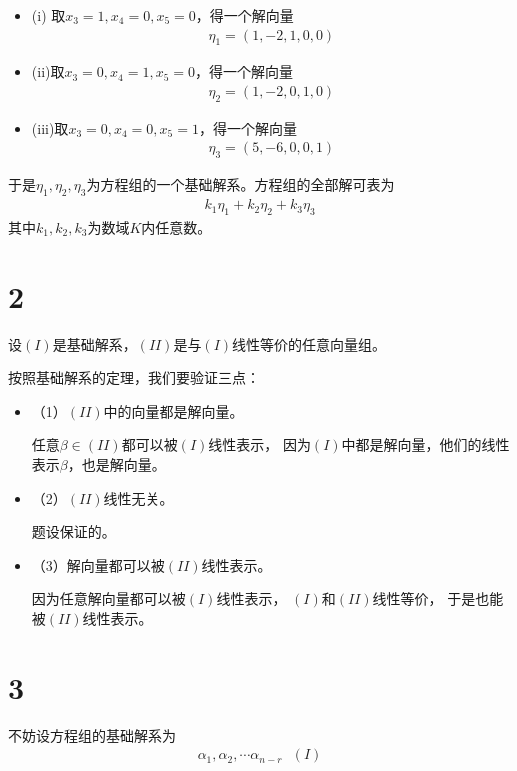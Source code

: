 \documentclass{article}
\begin{document}
\begin{itemize}
  \item (i) 取$x_3 = 1, x_4 = 0, x_5 = 0$，得一个解向量
        \begin{align*}
          \eta_1 = (1, -2, 1, 0, 0)
        \end{align*}
  \item (ii)取$x_3 = 0, x_4 = 1, x_5 = 0$，得一个解向量
        \begin{align*}
          \eta_2 = (1, -2, 0, 1, 0)
        \end{align*}
  \item (iii)取$x_3 = 0, x_4 = 0, x_5 = 1$，得一个解向量
        \begin{align*}
          \eta_3 = (5, -6, 0, 0, 1)
        \end{align*}
\end{itemize}
于是$\eta_1, \eta_2, \eta_3$为方程组的一个基础解系。方程组的全部解可表为
\begin{align*}
  k_1 \eta_1 + k_2 \eta_2 + k_3 \eta_3
\end{align*}
其中$k_1, k_2, k_3$为数域$K$内任意数。

\section*{2}

设$(I)$是基础解系，$(II)$是与$(I)$线性等价的任意向量组。

按照基础解系的定理，我们要验证三点：
\begin{itemize}
  \item （1）$(II)$中的向量都是解向量。

        任意$\beta \in (II)$都可以被$(I)$线性表示，
        因为$(I)$中都是解向量，他们的线性表示$\beta$，也是解向量。

  \item （2）$(II)$线性无关。

        题设保证的。

  \item （3）解向量都可以被$(II)$线性表示。

        因为任意解向量都可以被$(I)$线性表示，
        $(I)$和$(II)$线性等价，
        于是也能被$(II)$线性表示。
\end{itemize}

\section*{3}

不妨设方程组的基础解系为
\begin{align*}
  \alpha_1, \alpha_2, \cdots \alpha_{n - r} \ \ \ (I)
\end{align*}
\end{document}
